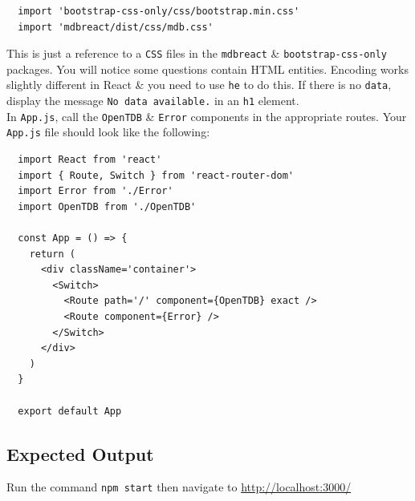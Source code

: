 \documentclass{article}
\begin{document}
\begin{verbatim}
  import 'bootstrap-css-only/css/bootstrap.min.css'
  import 'mdbreact/dist/css/mdb.css'
\end{verbatim}

This is just a reference to a \texttt{CSS} files in the \texttt{mdbreact} \& \texttt{bootstrap-css-only} packages. You will notice some questions contain HTML entities. Encoding works slightly different in React \& you need to use \texttt{he} to do this. If there is no \texttt{data}, display the message \texttt{No data available.} in an \texttt{h1} element. \\

In \texttt{App.js}, call the \texttt{OpenTDB} \& \texttt{Error} components in the appropriate routes. Your \texttt{App.js} file should look like the following:

\begin{verbatim}
  import React from 'react'
  import { Route, Switch } from 'react-router-dom'
  import Error from './Error'
  import OpenTDB from './OpenTDB'
  
  const App = () => {
    return (
      <div className='container'>
        <Switch>
          <Route path='/' component={OpenTDB} exact />
          <Route component={Error} />
        </Switch>
      </div>
    )
  }
  
  export default App  
\end{verbatim}

\subsection*{Expected Output} 
Run the command \texttt{npm start} then navigate to \href{http://localhost:3000/}{http://localhost:3000/} \\
\end{document}
